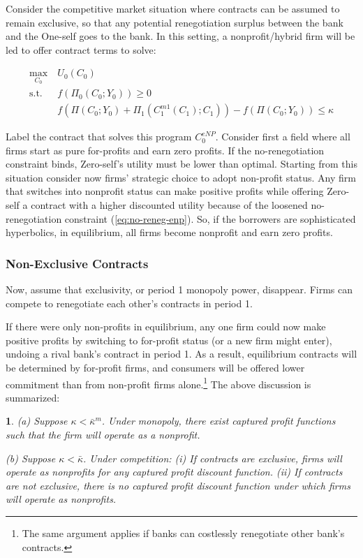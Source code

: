 \documentclass[11pt,english]{article}
\theoremstyle{plain}
\newtheorem{prop}{\protect\propositionname}
\theoremstyle{definition}
\providecommand{\propositionname}{Proposition}
\begin{document}
Consider the competitive market situation where contracts can be assumed to remain exclusive, so that any potential renegotiation surplus between the bank and the One-self
goes to the bank.
In this setting, a nonprofit/hybrid firm will be led to offer contract
terms to solve: 

\begin{align}
\underset{C_{0}}{\text{max}} & \ U_{0}\left(C_{0}\right)\\
\text{s.t.} & \ f\left(\Pi_{0}(C_{0};Y_{0})\right)\geq0\\
 & \ f\left(\Pi\left(C_{0};Y_{0}\right)+\Pi_{1}\left(C_{1}^{m1}\left(C_{1}\right);C_{1}\right)\right)-f\left(\Pi\left(C_{0};Y_{0}\right)\right)\leq\kappa\label{eq:no-reneg-enp}
\end{align}

Label the contract that solves this program  $C_{0}^{eNP}$. Consider first a field where all firms start as pure for-profits
and earn zero profits. If the no-renegotiation constraint binds, Zero-self's
utility must be lower than optimal. Starting from this situation consider
now firms' strategic choice to adopt non-profit status.
Any firm that switches into nonprofit status can make positive
profits while offering Zero-self a contract with a higher discounted
utility because of the loosened no-renegotiation constraint (\ref{eq:no-reneg-enp}).
So, if the borrowers are sophisticated hyperbolics, in equilibrium,
all firms become nonprofit and earn zero profits.

\subsubsection{Non-Exclusive Contracts}

Now, assume that exclusivity, or  period 1 monopoly power, disappear.
Firms can compete to renegotiate each other's contracts in period
1.

If there were only non-profits in equilibrium, any one firm could now make
positive profits by switching to for-profit status (or a new firm might enter), undoing a rival
bank's contract in period 1. As a result, equilibrium contracts will be
determined by for-profit firms, and consumers will be offered lower
commitment than from non-profit firms alone.\footnote{The same argument applies if banks can costlessly renegotiate other bank's contracts.} 
The above discussion is summarized: 
\begin{prop}
(a) Suppose $\kappa<\bar{\kappa}^{m}$. Under monopoly, there exist
captured profit functions such that the firm will operate as a nonprofit.

(b) Suppose $\kappa<\bar{\kappa}$. Under competition: (i) If contracts
are exclusive, firms will operate as nonprofits for any captured profit
discount function. (ii) If contracts are not exclusive, there is no
captured profit discount function under which firms will operate as
nonprofits. 
\end{prop}
\end{document}
